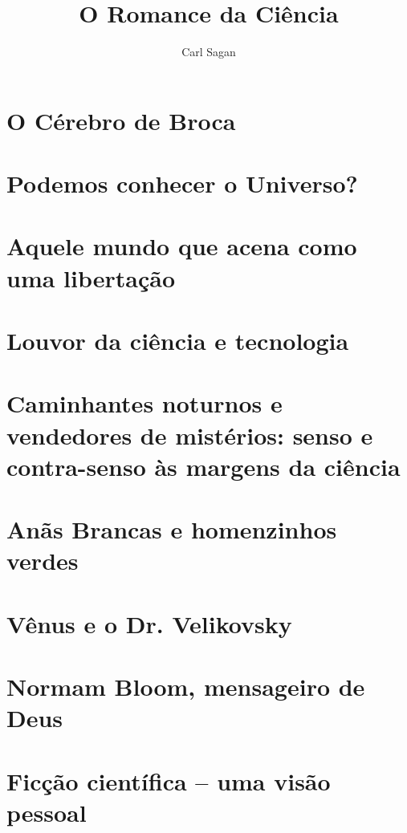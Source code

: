 \documentclass[12pt]{memoir}
\begin{document}
\title{O Romance da Ciência}
\author{Carl Sagan}
\date {}
\maketitle
\newpage

\tableofcontents*

\chapter{O Cérebro de Broca}
\setcounter{page}{17}
\chapter{Podemos conhecer o Universo?}
\setcounter{page}{27}
\chapter{Aquele mundo que acena como uma libertação}
\setcounter{page}{33}
\chapter{Louvor da ciência e tecnologia}
\setcounter{page}{46}
\chapter{Caminhantes noturnos e vendedores de mistérios: senso e contra-senso às margens da ciência} 
\setcounter{page}{57}
\chapter{Anãs Brancas e homenzinhos verdes}
\setcounter{page}{81}
\chapter{Vênus e o Dr. Velikovsky}
\setcounter{page}{96}
\chapter{Normam Bloom, mensageiro de Deus}
\setcounter{page}{144}
\chapter{Ficção científica -- uma visão pessoal}
\setcounter{page}{153}
\end{document}
